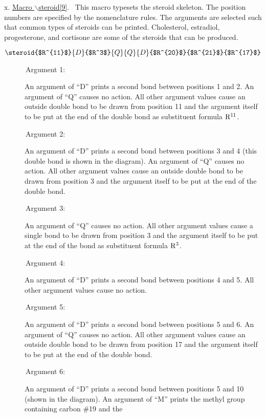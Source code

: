  \vspace{\len mm}
 \indent x. \underline{Macro $\backslash $steroid[9]}.
 \ This macro typesets the steroid skeleton. The position
 numbers are specified by the nomenclature rules. The 
 arguments are selected such that common types of steroids
 can be printed. Cholesterol, estradiol, progesterone,
 and cortisone are some of the steroids that can be produced.
   

 \[ \steroid{$R^{11}$}{D}{$R^3$}{Q}{Q}{D}{$R^{20}$}
     {$R^{21}$}{$R^{17}$}  \]

   
 \begin{description}
 \item[{\rm \ \ \ \ \ \ Argument 1:}] An argument of ``D'' 
      prints a second bond between positions 1 and 2.
      An argument of ``Q'' causes no action. All other
      argument values cause an outside double bond to be
      drawn from position 11 and the argument itself to be
      put at the end of the double bond as substituent
      formula ${\rm R^{11}}$.
 \newpage
 \item[{\rm \ \ \ \ \ \ Argument 2:}] An argument of ``D''
      prints a second bond between positions 3 and 4
      (this double bond is shown in the diagram).
      An argument of ``Q'' causes no action. All other
      argument values cause an outside double bond to be
      drawn from position 3 and the argument itself to be
      put at the end of the double bond.          
 \item[{\rm \ \ \ \ \ \ Argument 3:}] An argument of ``Q''
      causes no action. All other argument values cause
      a single bond to be drawn from position 3 and the
      argument itself to be put at the end of the bond
      as substituent formula ${\rm R^3}$.
 \item[{\rm \ \ \ \ \ \ Argument 4:}] An argument of ``D''
      prints a second bond between positions 4 and 5.
      All other argument values cause no action.
 \item[{\rm \ \ \ \ \ \ Argument 5:}] An argument of ``D''
      prints a second bond between positions 5 and 6.
      An argument of ``Q'' causes no action. All other
      argument values cause an outside double bond 
      to be drawn from position 17 and the argument
      itself to be put at the end of the double bond.
 \item[{\rm \ \ \ \ \ \ Argument 6:}] An argument of ``D''
      prints a second bond between positions 5 and 10
      (shown in the diagram). An argument of ``M''
      prints the methyl group containing carbon \#19 and the

\end{description}
